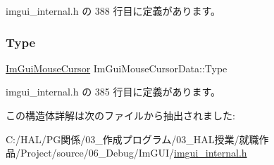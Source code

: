  imgui\+\_\+internal.\+h の 388 行目に定義があります。

\mbox{\label{struct_im_gui_mouse_cursor_data_ab58df812a8caf8741415053515b8f347}} 
\subsubsection{\texorpdfstring{Type}{Type}}
{\footnotesize\ttfamily \mbox{\hyperlink{imgui_8h_a9223d6c82bb5d12c2eab5f829ca520ef}{Im\+Gui\+Mouse\+Cursor}} Im\+Gui\+Mouse\+Cursor\+Data\+::\+Type}



 imgui\+\_\+internal.\+h の 385 行目に定義があります。



この構造体詳解は次のファイルから抽出されました\+:\begin{DoxyCompactItemize}
\item 
C\+:/\+H\+A\+L/\+P\+G関係/03\+\_\+作成プログラム/03\+\_\+\+H\+A\+L授業/就職作品/\+Project/source/06\+\_\+\+Debug/\+Im\+G\+U\+I/\mbox{\hyperlink{imgui__internal_8h}{imgui\+\_\+internal.\+h}}\end{DoxyCompactItemize}
